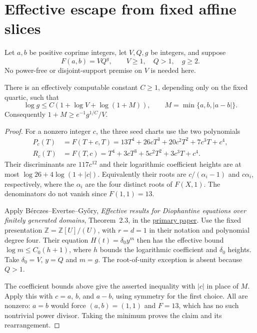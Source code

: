 \section{Effective escape from fixed affine slices}
\label{as-section}

Let $a,b$ be positive coprime integers, let $V,Q,g$ be integers, and suppose
\[
 F(a,b)=VQ^g,\qquad V\ge1,\quad Q>1,\quad g\ge2.
\]
No power-free or disjoint-support premise on $V$ is needed here.

\begin{theorem}\label{as-exponent}
There is an effectively computable constant $C\ge1$, depending only
on the fixed quartic, such that
\[
 \log g\le C(1+\log V+\log(1+M)),\qquad
 M=\min\{a,b,|a-b|\}.
\]
Consequently $1+M\ge e^{-1}g^{1/C}/V$.
\end{theorem}
\begin{proof}
For a nonzero integer $c$, the three seed charts use the two polynomials
\[
 \begin{split}
 P_c(T)&=F(T+c,T)
   =13T^4+26cT^3+20c^2T^2+7c^3T+c^4,\\
 R_c(T)&=F(T,c)=T^4+3cT^3+5c^2T^2+3c^3T+c^4.
 \end{split}
\]
Their discriminants are $117c^{12}$ and their logarithmic coefficient
heights are at most $\log26+4\log(1+|c|)$. Equivalently their roots
are $c/(\alpha_i-1)$ and $c\alpha_i$, respectively, where the
$\alpha_i$ are the four distinct roots of $F(X,1)$. The denominators
do not vanish since $F(1,1)=13$.

Apply B\'erczes--Evertse--Gy\H{o}ry, \emph{Effective results for
Diophantine equations over finitely generated domains}, Theorem~2.3,
in the \href{https://arxiv.org/pdf/1301.7175}{primary paper}.
Use the fixed presentation $\mathbb Z=\mathbb Z[U]/(U)$, with
$r=d=1$ in their notation and polynomial degree four. Their
equation $H(t)=\delta_0y^m$ then has the effective bound
$\log m\le C_0(h+1)$, where $h$ bounds the logarithmic coefficient
and $\delta_0$ heights. Take $\delta_0=V$, $y=Q$ and $m=g$.
The root-of-unity exception is absent because $Q>1$.

The coefficient bounds above give the asserted inequality with
$|c|$ in place of $M$. Apply this with $c=a$, $b$, and $a-b$,
using symmetry for the first choice. All are nonzero: $a=b$ would
force $(a,b)=(1,1)$ and $F=13$, which has no such nontrivial power
divisor. Taking the minimum proves the claim and its rearrangement.
\end{proof}

